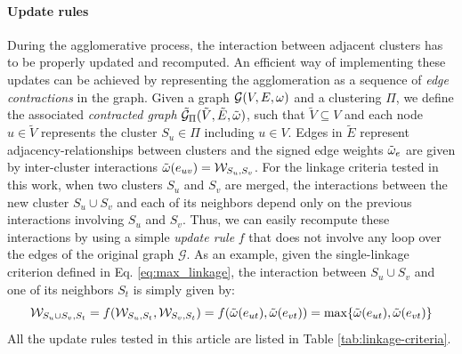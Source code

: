 \paragraph{Update rules} During the agglomerative process, the interaction between adjacent clusters has to be properly updated and recomputed.  %
An efficient way of implementing these updates can be achieved by representing the agglomeration as a sequence of \emph{edge contractions} in the graph. Given a graph $\mathcal{G}(V,E,\omega)$ and a clustering $\Pi$, we define the associated \emph{contracted graph} $\tilde{\mathcal{G}}_\Pi(\tilde{V}, \tilde{E}, \tilde{\omega})$, such that $\tilde{V} \subseteq V$ and each node $u\in \tilde{V}$ represents the cluster $S_u \in \Pi$ including $u\in V$. Edges in $\tilde{E}$ represent adjacency-relationships between clusters and the signed edge weights $\tilde{\omega}_e$ are given by inter-cluster interactions $\tilde{\omega}(e_{uv})=\mathcal{W}_{S_u,S_v}$. 
For the linkage criteria tested in this work, when two clusters $S_u$ and $S_v$ are merged, the interactions between the new cluster $S_u \cup S_v$ and each of its neighbors depend only on the previous interactions involving $S_u$ and $S_v$. Thus, we can easily recompute these interactions by using a simple \emph{update rule} $f$ that does not involve any loop over the edges of the original graph $\mathcal{G}$. As an example, given the single-linkage criterion defined in Eq. \ref{eq:max_linkage}, the interaction between $S_u \cup S_v$ and one of its neighbors $S_t$ is simply given by:
\begin{equation}
  \mathcal{W}_{S_u \cup S_v,S_t} = f( \mathcal{W}_{S_u,S_t}, \mathcal{W}_{S_v,S_t}) = f(\tilde{\omega}(e_{ut}), \tilde{\omega}(e_{vt})) = \max \{ \tilde{\omega}(e_{ut}), \tilde{\omega}(e_{vt}) \}
\end{equation}
All the update rules tested in this article are listed in Table \ref{tab:linkage-criteria}.
